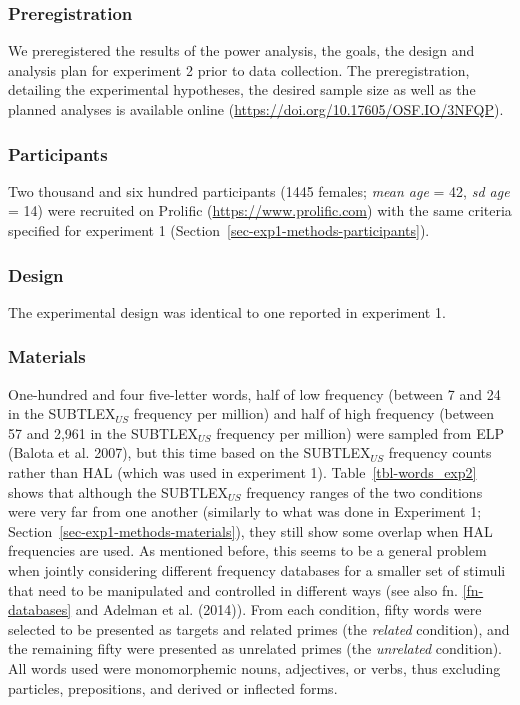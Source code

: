 \documentclass[
]{interact}
\begin{document}
\subsubsection{Preregistration}\label{sec-exp2-prereg}

We preregistered the results of the power analysis, the goals, the
design and analysis plan for experiment 2 prior to data collection. The
preregistration, detailing the experimental hypotheses, the desired
sample size as well as the planned analyses is available online
(\url{https://doi.org/10.17605/OSF.IO/3NFQP}).

\subsubsection{Participants}\label{sec-exp2-methods-participants}

Two thousand and six hundred participants (1445 females; \emph{mean age}
= 42, \emph{sd age} = 14) were recruited on Prolific
(\url{https://www.prolific.com}) with the same criteria specified for
experiment 1 (Section~\ref{sec-exp1-methods-participants}).

\subsubsection{Design}\label{sec-exp2-methods-design}

The experimental design was identical to one reported in experiment 1.

\subsubsection{Materials}\label{sec-exp2-methods-materials}

One-hundred and four five-letter words, half of low frequency (between 7
and 24 in the SUBTLEX\(_{US}\) frequency per million) and half of high
frequency (between 57 and 2,961 in the SUBTLEX\(_{US}\) frequency per
million) were sampled from ELP (Balota et al. 2007), but this time based
on the SUBTLEX\(_{US}\) frequency counts rather than HAL (which was used
in experiment 1). Table~\ref{tbl-words_exp2} shows that although the
SUBTLEX\(_{US}\) frequency ranges of the two conditions were very far
from one another (similarly to what was done in Experiment 1;
Section~\ref{sec-exp1-methods-materials}), they still show some overlap
when HAL frequencies are used. As mentioned before, this seems to be a
general problem when jointly considering different frequency databases
for a smaller set of stimuli that need to be manipulated and controlled
in different ways (see also fn. \ref{fn-databases} and Adelman et al.
(2014)). From each condition, fifty words were selected to be presented
as targets and related primes (the \emph{related} condition), and the
remaining fifty were presented as unrelated primes (the \emph{unrelated}
condition). All words used were monomorphemic nouns, adjectives, or
verbs, thus excluding particles, prepositions, and derived or inflected
forms.
\end{document}
